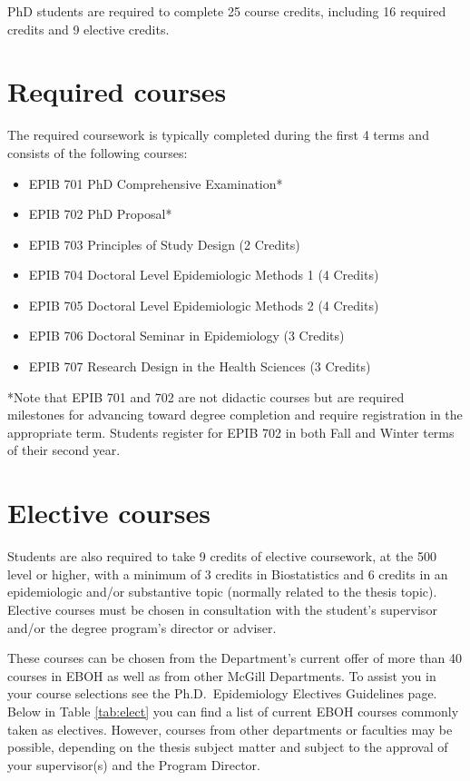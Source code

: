 \documentclass[
]{book}
\providecommand{\tightlist}{%
  \setlength{\itemsep}{0pt}\setlength{\parskip}{0pt}}
\begin{document}
PhD students are required to complete 25 course credits, including 16 required credits and 9 elective credits.

\hypertarget{required-courses}{%
\section{Required courses}\label{required-courses}}

The required coursework is typically completed during the first 4 terms and consists of the following courses:

\begin{itemize}
\tightlist
\item
  EPIB 701 PhD Comprehensive Examination*
\item
  EPIB 702 PhD Proposal*
\item
  EPIB 703 Principles of Study Design (2 Credits)
\item
  EPIB 704 Doctoral Level Epidemiologic Methods 1 (4 Credits)
\item
  EPIB 705 Doctoral Level Epidemiologic Methods 2 (4 Credits)
\item
  EPIB 706 Doctoral Seminar in Epidemiology (3 Credits)
\item
  EPIB 707 Research Design in the Health Sciences (3 Credits)
\end{itemize}

*Note that EPIB 701 and 702 are not didactic courses but are required milestones for advancing toward degree completion and require registration in the appropriate term. Students register for EPIB 702 in both Fall and Winter terms of their second year.

\hypertarget{elective-courses}{%
\section{Elective courses}\label{elective-courses}}

Students are also required to take 9 credits of elective coursework, at the 500 level or higher, with a minimum of 3 credits in Biostatistics and 6 credits in an epidemiologic and/or substantive topic (normally related to the thesis topic). Elective courses must be chosen in consultation with the student's supervisor and/or the degree program's director or adviser.

These courses can be chosen from the Department's current offer of more than 40 courses in EBOH as well as from other McGill Departments. To assist you in your course selections see the Ph.D.~Epidemiology Electives Guidelines page. Below in Table \ref{tab:elect} you can find a list of current EBOH courses commonly taken as electives. However, courses from other departments or faculties may be possible, depending on the thesis subject matter and subject to the approval of your supervisor(s) and the Program Director.
\end{document}

